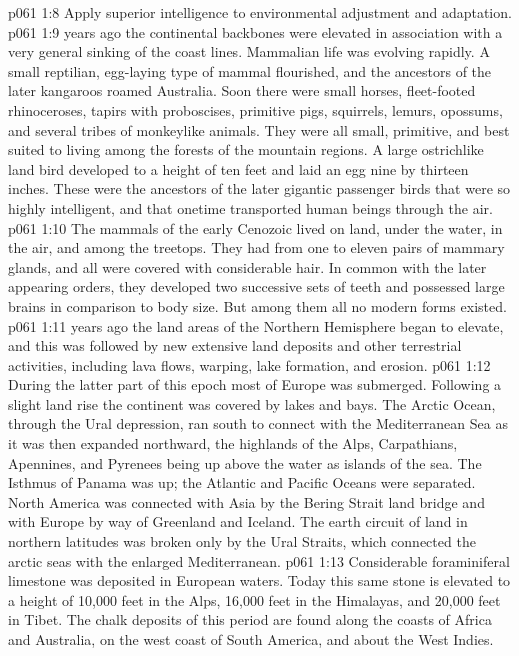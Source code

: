 \vs p061 1:8 \bibnobreakspace Apply superior intelligence to environmental adjustment and adaptation.
\pc \vs p061 1:9  years ago the continental backbones were elevated in association with a very general sinking of the coast lines. Mammalian life was evolving rapidly. A small reptilian, egg\hyp{}laying type of mammal flourished, and the ancestors of the later kangaroos roamed Australia. Soon there were small horses, fleet\hyp{}footed rhinoceroses, tapirs with proboscises, primitive pigs, squirrels, lemurs, opossums, and several tribes of monkeylike animals. They were all small, primitive, and best suited to living among the forests of the mountain regions. A large ostrichlike land bird developed to a height of ten feet and laid an egg nine by thirteen inches. These were the ancestors of the later gigantic passenger birds that were so highly intelligent, and that onetime transported human beings through the air.
\vs p061 1:10 The mammals of the early Cenozoic lived on land, under the water, in the air, and among the treetops. They had from one to eleven pairs of mammary glands, and all were covered with considerable hair. In common with the later appearing orders, they developed two successive sets of teeth and possessed large brains in comparison to body size. But among them all no modern forms existed.
\pc \vs p061 1:11  years ago the land areas of the Northern Hemisphere began to elevate, and this was followed by new extensive land deposits and other terrestrial activities, including lava flows, warping, lake formation, and erosion.
\vs p061 1:12 During the latter part of this epoch most of Europe was submerged. Following a slight land rise the continent was covered by lakes and bays. The Arctic Ocean, through the Ural depression, ran south to connect with the Mediterranean Sea as it was then expanded northward, the highlands of the Alps, Carpathians, Apennines, and Pyrenees being up above the water as islands of the sea. The Isthmus of Panama was up; the Atlantic and Pacific Oceans were separated. North America was connected with Asia by the Bering Strait land bridge and with Europe by way of Greenland and Iceland. The earth circuit of land in northern latitudes was broken only by the Ural Straits, which connected the arctic seas with the enlarged Mediterranean.
\vs p061 1:13 Considerable foraminiferal limestone was deposited in European waters. Today this same stone is elevated to a height of 10,000 feet in the Alps, 16,000 feet in the Himalayas, and 20,000 feet in Tibet. The chalk deposits of this period are found along the coasts of Africa and Australia, on the west coast of South America, and about the West Indies.
